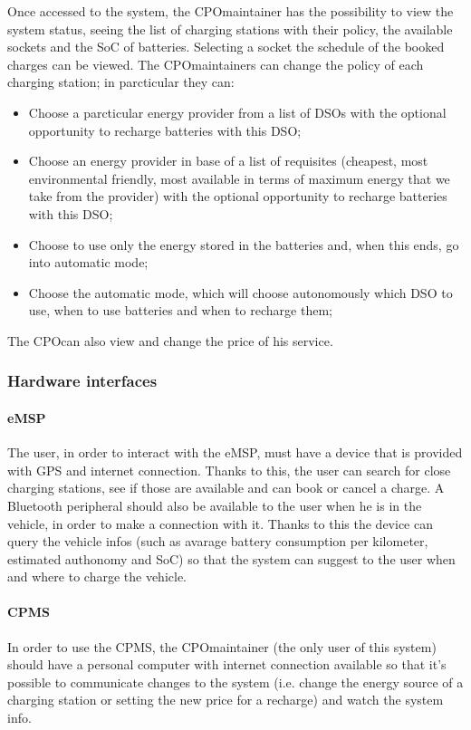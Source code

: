 Once accessed to the system, the \ac{CPO}maintainer has the possibility to view the system status, seeing the list of charging stations with their policy, the available sockets and the \ac{SoC} of batteries. Selecting a socket the schedule of the booked charges can be viewed.
The \ac{CPO}maintainers can change the policy of each charging station; in parcticular they can:
\begin{itemize}
    \item Choose a parcticular energy provider from a list of \acp{DSO} with the optional opportunity to recharge batteries with this \ac{DSO};
    \item Choose an energy provider in base of a list of requisites (cheapest, most environmental friendly, most available in terms of maximum energy that we take from the provider) with the optional opportunity to recharge batteries with this \ac{DSO};
    \item Choose to use only the energy stored in the batteries and, when this ends, go into automatic mode;
    \item Choose the automatic mode, which will choose autonomously which \ac{DSO} to use, when to use batteries and when to recharge them;
\end{itemize}

The \ac{CPO}can also view and change the price of his service.

\subsubsection{Hardware interfaces}
\paragraph{\ac{eMSP}}
The user, in order to interact with the \ac{eMSP}, must have a device that is provided with \ac{GPS} and internet connection. Thanks to this, the user can search for close charging stations, see if those are available and can book or cancel a charge. 
A Bluetooth peripheral should also be available to the user when he is in the vehicle, in order to make a connection with it. Thanks to this the device can query the vehicle infos (such as avarage battery consumption per kilometer, estimated authonomy and \ac{SoC}) so that the system can suggest to the user when and where to charge the vehicle.

\paragraph{\ac{CPMS}}
In order to use the \ac{CPMS}, the \ac{CPO}maintainer (the only user of this system) should have a personal computer with internet connection available so that it's possible to communicate changes to the system (i.e. change the energy source of a charging station or setting the new price for a recharge) and watch the system info.

